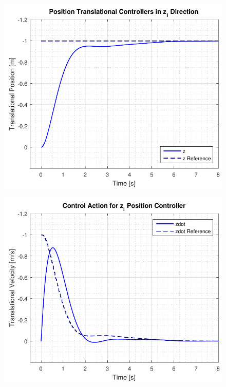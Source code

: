 \begin{minipage}{\linewidth}
    \begin{minipage}{0.45\linewidth}
        \begin{figure}[H]
            \vspace{-1.3cm}
            \includegraphics[scale=.45]{figures/positionControllerZ}
            \centering			
            \label{fig:positionControllersZ}
        \end{figure}
    \end{minipage}
    \hspace{0.03\linewidth}
    \begin{minipage}{0.45\linewidth}
        \begin{figure}[H]
            \includegraphics[scale=.45]{figures/positionControllerZAction}

\end{figure}
\end{minipage}
\end{minipage}
